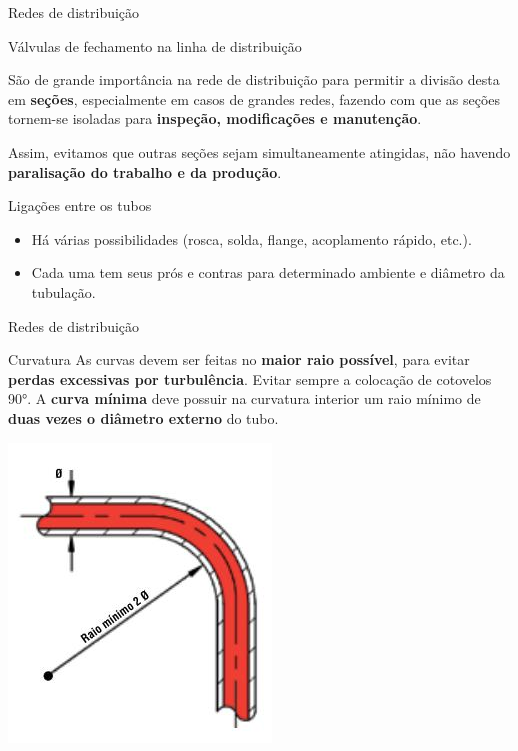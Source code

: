 \begin{frame}{Redes de distribuição}
	\begin{block}{Válvulas de fechamento na linha de distribuição}
			
			São de grande importância na rede de distribuição para permitir a divisão desta em \textbf{seções}, especialmente em casos de grandes redes, fazendo com que as seções tornem-se isoladas para \textbf{inspeção, modificações e manutenção}.
			
			Assim, evitamos que outras seções sejam simultaneamente atingidas, não havendo \textbf{paralisação do trabalho e da produção}.
	\end{block}
	\begin{block}{Ligações entre os tubos}
		\begin{itemize}
			\item Há várias possibilidades (rosca, solda, flange,
			acoplamento rápido, etc.).
			\item Cada uma tem seus prós e contras para determinado ambiente e diâmetro da tubulação.
		\end{itemize}
	\end{block}
\end{frame}


\begin{frame}{Redes de distribuição}
	\begin{block}{Curvatura}
		As curvas devem ser feitas no \textbf{maior raio possível}, para evitar \textbf{perdas excessivas por turbulência}. Evitar sempre a colocação de cotovelos \ang{90}. A \textbf{curva mínima} deve possuir na curvatura interior um raio mínimo de \textbf{duas vezes o diâmetro externo} do tubo.
	\end{block}

	\centering
	\includegraphics[width=0.4\linewidth]{Figuras/Ch13/fig11}

\end{frame}


